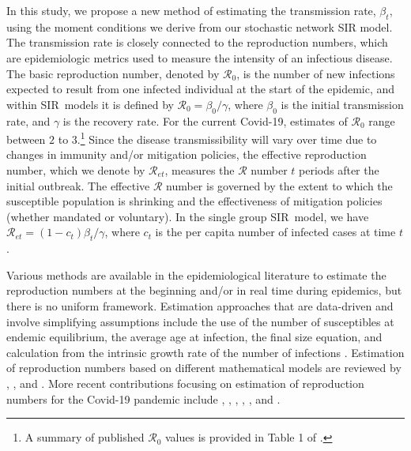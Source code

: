 \documentclass[12pt]{article}
\begin{document}
In this study, we propose a new method of estimating the transmission rate,
$\beta_{t}$, using the moment conditions we derive from our stochastic network
SIR model. The transmission rate is closely connected to the reproduction
numbers, which are epidemiologic metrics used to measure the intensity of an
infectious disease. The basic reproduction number, denoted by $\mathcal{R}%
_{0}$, is the number of new infections expected to result from one infected
individual at the start of the epidemic, and within SIR\ models it is defined
by $\mathcal{R}_{0}=\beta_{0}/\gamma$, where $\beta_{0}$ is the initial
transmission rate, and $\gamma$ is the recovery rate. For the current
Covid-19, estimates of $\mathcal{R}_{0}$ range between $2$ to $3$.\footnote{A
summary of published $\mathcal{R}_{0}$ values is provided in Table 1 of
\cite{DArienzo2020R0Italy}.} Since the disease transmissibility will vary over
time due to changes in immunity and/or mitigation policies, the effective
reproduction number, which we denote by $\mathcal{R}_{et}$, measures the
$\mathcal{R}$ number $t$ periods after the initial outbreak. The effective
$\mathcal{R}$ number is governed by the extent to which the susceptible
population is shrinking and the effectiveness of mitigation policies (whether
mandated or voluntary). In the single group SIR\ model, we have $\mathcal{R}%
_{et}=\left(  1-c_{t}\right)  \beta_{t}/\gamma$, where $c_{t}$ is the per
capita number of infected cases at time $t$.

Various methods are available in the epidemiological literature to estimate
the reproduction numbers at the beginning and/or in real time during
epidemics, but there is no uniform framework. Estimation approaches that are
data-driven and involve simplifying assumptions include the use of the number
of susceptibles at endemic equilibrium, the average age at infection, the
final size equation, and calculation from the intrinsic growth rate of the
number of infections
\citep*{Heffernan2005perspectives}%
. Estimation of reproduction numbers based on different mathematical models
are reviewed by \cite{Chowell2008review},
\citet*{Obadia2012R0review}%
, and \cite{Nikbakht2019comparison}. More recent contributions focusing on
estimation of reproduction numbers for the Covid-19 pandemic include
\citet*
{Atkeson2020estimating}%
, \cite{Baqaee2020secondwave}, \cite{ElliottGourieroux2020},
\cite{Fernandez2020SIRD}, \cite{Korolev2020JoE}, and \cite{Toda2020SIR}.
\end{document}
